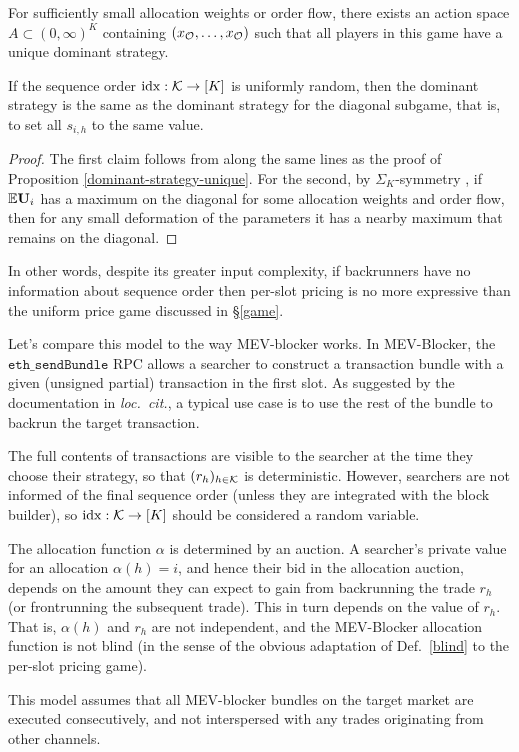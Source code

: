 \begin{proposition}

  For sufficiently small allocation weights or order flow, there exists an action space $A\subset(0,\infty)^K$ containing $(x_{\mathcal{O}},\ldots,x_{\mathcal{O}})$ such that all players in this game have a unique dominant strategy.

  If the sequence order $\mathrm{idx}:\mathcal{K}\rightarrow[K]$ is uniformly random, then the dominant strategy is the same as the dominant strategy for the diagonal subgame, that is, to set all $s_{i,h}$ to the same value.

\end{proposition}
%
\begin{proof}

  The first claim follows from along the same lines as the proof of Proposition \ref{dominant-strategy-unique}.
  For the second, by $\Sigma_K$-symmetry , if $\mathbb{E}\mathbf{U}_i$ has a maximum on the diagonal for some allocation weights and order flow, then for any small deformation of the parameters it has a nearby maximum that remains on the diagonal.
  \qedhere

\end{proof}

In other words, despite its greater input complexity, if backrunners have no information about sequence order then per-slot pricing is no more expressive than the uniform price game discussed in \S\ref{game}.


\begin{example}

  Let's compare this model to the way MEV-blocker \cite{mevblocker2023docs} works.
  In MEV-Blocker, the $\mathtt{eth\_sendBundle}$ RPC allows a searcher to construct a transaction bundle with a given (unsigned partial) transaction in the first slot.
  As suggested by the documentation in \emph{loc.~cit.}, a typical use case is to use the rest of the bundle to backrun the target transaction.
  
  The full contents of transactions are visible to the searcher at the time they choose their strategy, so that $(r_h)_{h\in\mathcal{K}}$ is deterministic.
  However, searchers are not informed of the final sequence order (unless they are integrated with the block builder), so $\mathrm{idx}:\mathcal{K}\rightarrow[K]$ should be considered a random variable.
  
  The allocation function $\alpha$ is determined by an auction.
  A searcher's private value for an allocation $\alpha(h)=i$, and hence their bid in the allocation auction, depends on the amount they can expect to gain from backrunning the trade $r_h$ (or frontrunning the subsequent trade).
  This in turn depends on the value of $r_h$.
  That is, $\alpha(h)$ and $r_h$ are not independent, and the MEV-Blocker allocation function is not blind (in the sense of the obvious adaptation of Def.~\ref{blind} to the per-slot pricing game).
  
  This model assumes that all MEV-blocker bundles on the target market are executed consecutively, and not interspersed with any trades originating from other channels.

\end{example}

